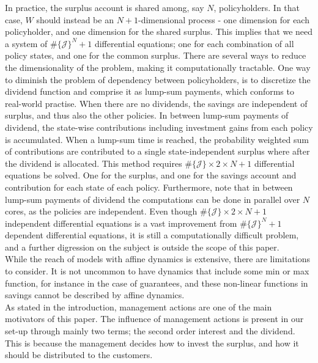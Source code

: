 \documentclass[12pt]{article}
\theoremstyle{my_thm}
\begin{document}
In practice, the surplus account is shared among, say $N$, policyholders. In that case, $W$ should instead be an $N+1$-dimensional process - one dimension for each policyholder, and one dimension for the shared surplus. This implies that we need a system of $\# \{ \mathcal{J} \}^N+1$ differential equations; one for each combination of all policy states, and one for the common surplus. There are several ways to reduce the dimensionality of the problem, making it computationally tractable. One way to diminish the problem of dependency between policyholders, is to discretize the dividend function and comprise it as lump-sum payments, which conforms to real-world practise. When there are no dividends, the savings are independent of surplus, and thus also the other policies. In between lump-sum payments of dividend, the state-wise contributions including investment gains from each policy is accumulated. When a lump-sum time is reached, the probability weighted sum of contributions are contributed to a single state-independent surplus where after the dividend is allocated. This method requires $\# \{ \mathcal{J} \} \times 2 \times N + 1$ differential equations be solved. One for the surplus, and one for the savings account and contribution for each state of each policy. Furthermore, note that in between lump-sum payments of dividend the computations can be done in parallel over $N$ cores, as the policies are independent. Even though $\# \{ \mathcal{J} \} \times 2 \times N + 1$ independent differential equations is a vast improvement from $\# \{ \mathcal{J} \}^N + 1$ dependent differential equations, it is still a computationally difficult problem, and a further digression on the subject is outside the scope of this paper.
\\[12pt]
While the reach of models with affine dynamics is extensive, there are limitations to consider. It is not uncommon to have dynamics that include some min or max function, for instance in the case of guarantees, and these non-linear functions in savings cannot be described by affine dynamics. \\
As stated in the introduction, management actions are one of the main motivators of this paper. The influence of management actions is present in our set-up through mainly two terms; the second order interest and the dividend. This is because the management decides how to invest the surplus, and how it should be distributed to the customers.
\end{document}
